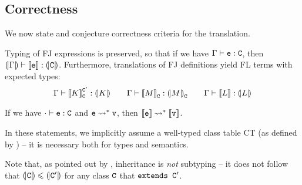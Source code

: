 \subsection{Correctness}

We now state and conjecture correctness criteria for the translation.

\begin{conjecture}
    Typing of FJ expressions is preserved, so that if we have $\Gamma \vdash \texttt{e} : \texttt{C}$, then $\denoty{\Gamma} \vdash \denot{\fj e} : \denoty{\fj C}$. Furthermore, translations of FJ definitions yield FL terms with expected types:
    $$ \Gamma \vdash \denot{K}_{\fj C}^{\fj C'} : \denoty{K} \qquad \Gamma \vdash \denot{M}_{\fj C} : \denoty{M}_{\fj C} \qquad \Gamma \vdash \denot{L} : \denoty{L} $$
\end{conjecture}

\begin{conjecture}
    If we have $\cdot \vdash \texttt{e} : \texttt{C}$ and $\texttt{e} \leadsto^* \texttt{v}$, then $\denot{\fj e} \step^* \denot{\fj v}$.
\end{conjecture}

In these statements, we implicitly assume a well-typed class table $\mathrm{CT}$ (as defined by \textcite{featherweight-java}) -- it is necessary both for types and semantics.

Note that, as pointed out by \textcite{inheritance-subtyping}, inheritance is \emph{not} subtyping -- it does not follow that $\denoty{\fj C} \sub \denoty {\fj C'}$ for any class $\texttt{C}$ that $\texttt{extends C}'$.

